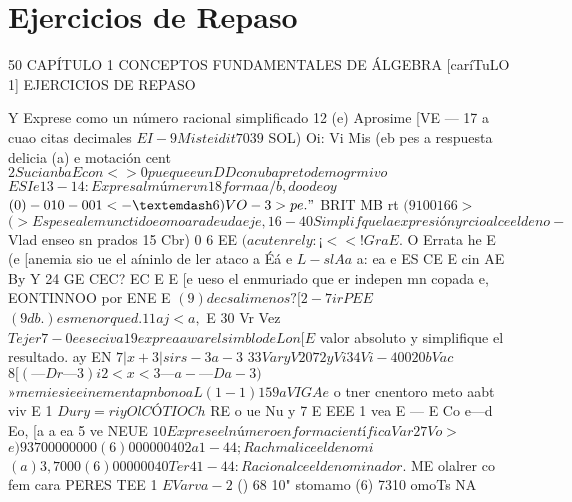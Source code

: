 \documentclass[12pt]{article}
\begin{document}
\section*{Ejercicios de Repaso}
50 CAPÍTULO 1 CONCEPTOS FUNDAMENTALES DE ÁLGEBRA
[caríTuLO 1] EJERCICIOS DE REPASO  

Y Exprese como un número racional simplificado 12 (e) Aprosime [VE — 17 a cuao citas decimales
$EI-9 Mist ei dit 7039$
SOL) Oi: Vi Mis (eb pes a respuesta delicia (a) e motación cent
$2 Sucia nba Econ <> 0 pue que eun DD con uba preto demo grmivo$
$ES Ie 13-14: Expres al múmervn 18 forma a/b, doodeo y$
$(0) -010-001 <-— 6) VO-3 > pe . "$
BRIT MB rt
$(9 100166 >$
$(> Espese al emunctidoeomoara deuda eje, 16-40 Simplifque la expresión y rcioalce el deno-$
Vlad enseo sn prados
15 Cbr) 0 6 EE
$(acutenrely: ¡<<! Gra E.$
O Errata he E (e
[anemia sio ue el aíninlo de ler ataco a Éá e
$L-sl Aa$
a: ea e
ES CE E
cin AE
By Y 24 GE
CEC? EC E E
[e ueso el enmuriado que er indepen mn copada e, EONTINNOO por
ENE E
$(9) de csalimenos? [2-7 ir PEE$
$(9 db.) esmenorqued. 11 aj<a ,$
E 30 Vr Vez
$Tejer 7-0 eeseciva 19 expre aa war el simblo de Lon [E$
valor absoluto y simplifique el resultado. ay EN
$7 |x+3|sirs-3 a-3$
$33 Vary V207 2yVi 34 Vi-400 20bVac$
$8 [(— Dr —3)i2<x<3 —a-—Da-3)$
$» memiesieeinementapn bono a L( 1-1) 159 a VIGA e$
o tner cnentoro meto aabt viv E
1
$Dury=riy Ol CÓTIO Ch$
RE o ue
Nu y 7 E EEE
1 vea
E — E
Co e—d Eo, [a a ea
5 ve NEUE
$10 Exprese el número en forma científica Var 27 Vo >$
$e) 93700000000 (6) 000000402 a 1-44; Rachmalice el denomi$
$(a) 3,7000 (6) 00000040 Ter 41-44: Racionalce el denominador.$
ME olalrer co fem cara PERES TEE 1
$E Var va-2$
() 68 10" stomamo (6) 7310 omoTs NA
\end{document}
